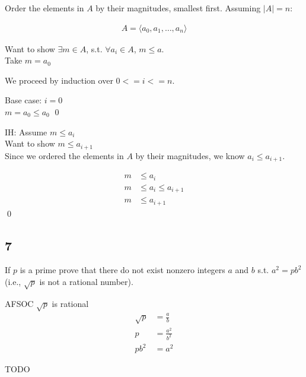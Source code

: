 \documentclass[12pt]{article}
\begin{document}
Order the elements in $A$ by their magnitudes, smallest first. Assuming $|A| = n$:

\begin{align*}
  A = \langle a_0, a_1, \ldots, a_n \rangle
\end{align*}

Want to show $\exists m \in A$, s.t. $\forall a_i \in A$, $m \leq a$. \\

Take $m = a_0$

We proceed by induction over $0 <= i <= n$.

Base case: $i = 0$ \\
$m = a_0 \leq a_0$ \qed{}

IH\@: Assume $m \leq a_i$ \\
Want to show $m \leq a_{i+1}$ \\

Since we ordered the elements in $A$ by their magnitudes, we know $a_i \leq a_{i+1}$.

\begin{align*}
  m &\leq a_i \tag*{by IH} \\
  m &\leq a_i \leq a_{i+1} \tag*{as seen above} \\
  m &\leq a_{i+1}
\end{align*} \qed{}

\subsection*{7}

If $p$ is a prime prove that there do not exist nonzero integers $a$ and $b$ s.t. $a^2 = pb^2$ (i.e., $\sqrt{p}$ is not a rational number).

AFSOC $\sqrt{p}$ is rational \\

\begin{align*}
  \sqrt{p} &= \frac{a}{b} \tag*{by definition of rational} \\
  p &= \frac{a^2}{b^2} \\
  pb^2 &= a^2
\end{align*}

TODO
\end{document}
